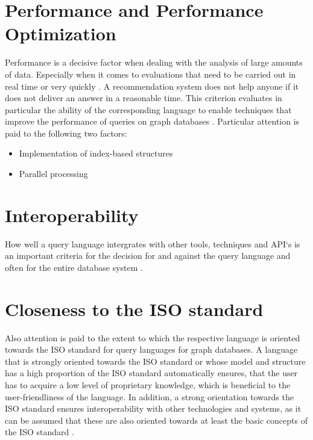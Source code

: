 \section{Performance and Performance Optimization}
\label{sec:criteria_for_comparison:performance}
Performance is a decisive factor when dealing with the analysis of large amounts of data. 
Especially when it comes to evaluations that need to be carried 
out in real time or very quickly \citep{yuanyuan_tian_world_2022}. 
A recommendation system does not help anyone if it does not deliver 
an answer in a reasonable time.
This criterion evaluates in particular the ability 
of the corresponding language to enable techniques 
that improve the performance of queries on graph databases \citep{yuanyuan_tian_world_2022}.
Particular attention is paid to the following two factors:
\begin{itemize}
	\item Implementation of index-based structures
	\item Parallel processing
\end{itemize}


\section{Interoperability}
\label{sec:criteria_for_comparison:interoperability}
How well a query language intergrates with other tools, techniques and API`s is an important
criteria for the decision for and against the query language and often for the entire 
database system \citep{timon-reina_overview_2021}.

\section{Closeness to the ISO standard}
\label{sec:criteria_for_comparison:iso}
Also attention is paid to the extent to which the respective language is oriented 
towards the ISO standard for query languages for graph databases.
A language that is strongly oriented towards the ISO standard or whose model and structure 
has a high proportion of the ISO standard automatically ensures, 
that the user has to acquire a low level of proprietary knowledge, 
which is beneficial to the user-friendliness of the language.
In addition, a strong orientation towards the ISO standard ensures interoperability 
with other technologies and systems, 
as it can be assumed that these are also oriented 
towards at least the basic concepts of the ISO standard \citep{hare_isoiec_2024}.

